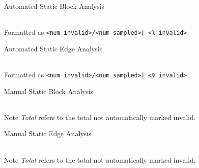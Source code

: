 \documentclass{article}
\begin{document}
\begin{table*}[h!]
	\centering
    \caption{Automated Static Block Analysis}
	\label{tab:auto-block-analysis}
    \vspace{0.5ex}
	\resizebox{0.9\textwidth}{!}{%
		\small
		
    } \\
    \vspace{1ex}
    Formatted as \texttt{<num invalid>/<num sampled>| <\% invalid>}
\end{table*}

\begin{table*}[h!]
	\centering
    \caption{Automated Static Edge Analysis}
	\label{tab:auto-edge-analysis}
    \vspace{0.5ex}
	\resizebox{0.9\textwidth}{!}{%
		\small
		
    } \\
    \vspace{1ex}
    Formatted as \texttt{<num invalid>/<num sampled>| <\% invalid>}
\end{table*}

\begin{table*}[h!]
	\centering
    \caption{Manual Static Block Analysis}
	\label{tab:man-block-analysis}
    \vspace{0.5ex}
	\resizebox{0.9\textwidth}{!}{%
		\small
		
    } \\
    \vspace{1ex}
    Note \textit{Total} refers to the total not automatically marked invalid.
\end{table*}

\begin{table*}[h!]
	\centering
    \caption{Manual Static Edge Analysis}
	\label{tab:man-edge-analysis}
    \vspace{0.5ex}
	\resizebox{0.9\textwidth}{!}{%
		\small
		
    } \\
    \vspace{1ex}
    Note \textit{Total} refers to the total not automatically marked invalid.
\end{table*}
\end{document}
